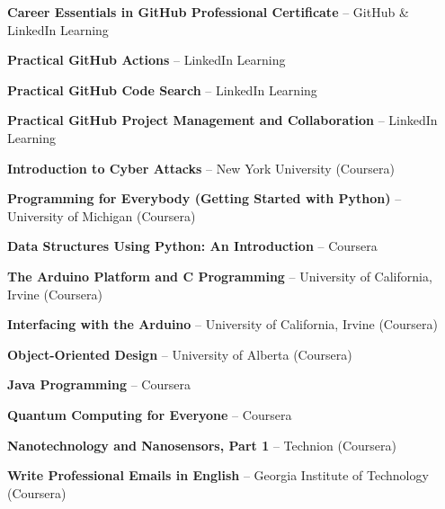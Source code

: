 \documentclass[a4paper,11pt]{article}
\begin{document}
\begin{itemize}[leftmargin=0in, label={}]

\small{

\item{
\textbf{Career Essentials in GitHub Professional Certificate} -- GitHub \& LinkedIn Learning
}

\item{
\textbf{Practical GitHub Actions} -- LinkedIn Learning
}

\item{
\textbf{Practical GitHub Code Search} -- LinkedIn Learning
}

\item{
\textbf{Practical GitHub Project Management and Collaboration} -- LinkedIn Learning
}

\item{
\textbf{Introduction to Cyber Attacks} -- New York University (Coursera)
}

\item{
\textbf{Programming for Everybody (Getting Started with Python)} -- University of Michigan (Coursera)
}

\item{
\textbf{Data Structures Using Python: An Introduction} -- Coursera
}

\item{
\textbf{The Arduino Platform and C Programming} -- University of California, Irvine (Coursera)
}

\item{
\textbf{Interfacing with the Arduino} -- University of California, Irvine (Coursera)
}

\item{
\textbf{Object-Oriented Design} -- University of Alberta (Coursera)
}

\item{
\textbf{Java Programming} -- Coursera
}

\item{
\textbf{Quantum Computing for Everyone} -- Coursera
}

\item{
\textbf{Nanotechnology and Nanosensors, Part 1} -- Technion (Coursera)
}

\item{
\textbf{Write Professional Emails in English} -- Georgia Institute of Technology (Coursera)
}

}

\end{itemize}

\vspace{-10pt}
\end{document}

